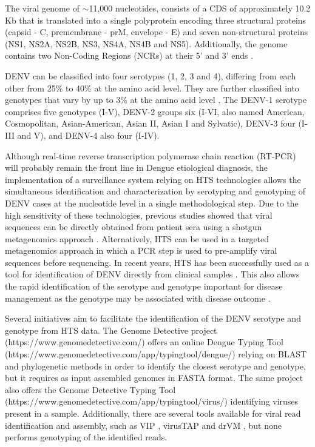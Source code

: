 The viral genome of $\sim$11,000 nucleotides, consists of a CDS of approximately 10.2 Kb that is translated into a single polyprotein encoding three structural proteins (capsid - C, premembrane - prM, envelope - E) and seven non-structural proteins (NS1, NS2A, NS2B, NS3, NS4A, NS4B and NS5). Additionally, the genome contains two Non-Coding Regions (NCRs) at their 5’ and 3’ ends \citep{leitmeyer_dengue_1999}.

DENV can be classified into four serotypes (1, 2, 3 and 4), differing from each other from 25\% to 40\% at the amino acid level. They are further classified into genotypes that vary by up to 3\% at the amino acid level \citep{diamond_molecular_2015}. The DENV-1 serotype comprises five genotypes (I-V), DENV-2 groups six (I-VI, also named American, Cosmopolitan, Asian-American, Asian II, Asian I and Sylvatic), DENV-3 four (I-III and V), and DENV-4 also four (I-IV).

Although real-time reverse transcription polymerase chain reaction (RT-PCR) will probably remain the front line in Dengue etiological diagnosis, the implementation of a surveillance system relying on HTS technologies allows the simultaneous identification and characterization by serotyping and genotyping of DENV cases at the nucleotide level in a single methodological step. Due to the high sensitivity of these technologies, previous studies showed that viral sequences can be directly obtained from patient sera using a shotgun metagenomics approach \citep{yozwiak_virus_2012}. Alternatively, HTS can be used in a targeted metagenomics approach in which a PCR step is used to pre-amplify viral sequences before sequencing. In recent years, HTS has been successfully used as a tool for identification of DENV directly from clinical samples \citep{yozwiak_virus_2012, lee_clinical_2017}. This also allows the rapid identification of the serotype and genotype important for disease management as the genotype may be associated with disease outcome \citep{fatima_serotype_2011}.

Several initiatives aim to facilitate the identification of the DENV serotype and genotype from HTS data. The Genome Detective project (https://www.genomedetective.com/) offers an online Dengue Typing Tool (https://www.genomedetective.com/app/typingtool/dengue/) \citep{fonseca_computational_2019} relying on BLAST and phylogenetic methods in order to identify the closest serotype and genotype, but it requires as input assembled genomes in FASTA format. The same project also offers the Genome Detective Typing Tool (https://www.genomedetective.com/app/typingtool/virus/) \citep{vilsker_genome_2019} identifying viruses present in a sample. Additionally, there are several tools available for viral read identification and assembly, such as VIP \citep{li_vip_2016}, virusTAP \citep{yamashita_virustap_2016} and drVM \citep{lin_drvm_2017}, but none performs genotyping of the identified reads.

